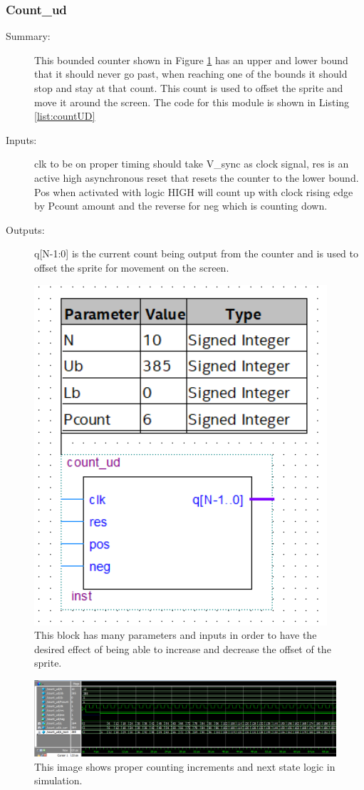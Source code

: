 \documentclass[a4paper]{article}
\begin{document}
\subsubsection{Count\_ud}
\begin{description}
    \item[Summary: ] This bounded counter shown in Figure \ref{fig:count_ud} has an upper and lower bound that it should never go past, when reaching one of the bounds it should stop and stay at that count. This count is used to offset the sprite and move it around the screen. The code for this module is shown in Listing \ref{list:countUD}
    
    \item[Inputs: ] clk to be on proper timing should take V\_sync as clock signal, res is an active high asynchronous reset that resets the counter to the lower bound. Pos when activated with logic HIGH will count up with clock rising edge by Pcount amount and the reverse for neg which is counting down.
    
    \item[Outputs: ] q[N-1:0] is the current count being output from the counter and is used to offset the sprite for movement on the screen.
    
\end{description}

\begin{figure}[H]
    \centering
    \includegraphics[width=.5\textwidth]{Images/matthew_blocks/countUD.png}
    \caption{This block has many parameters and inputs in order to have the desired effect of being able to increase and decrease the offset of the sprite.}
    \label{fig:count_ud}
\end{figure}

\begin{figure}[H]
    \centering
    \includegraphics[width=5.91in]{Images/matthew_blocks/countUDSim1.png}
    \caption{This image shows proper counting increments and next state logic in simulation.}
    \label{fig:count_udS1}
\end{figure}
\end{document}
